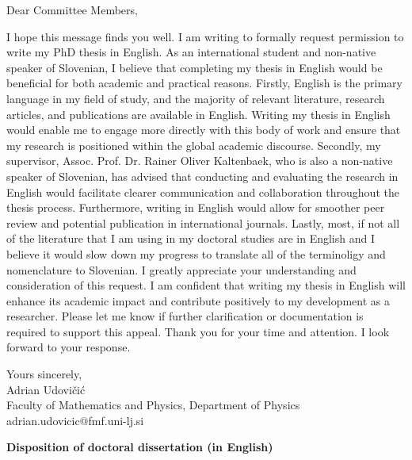 \documentclass{article}
\theoremstyle{mytheoremstyle}
\theoremstyle{mytheoremstyle}
\theoremstyle{myproblemstyle}
\begin{document}
\vspace{1cm} %
Dear Committee Members,
\vspace{1cm}

I hope this message finds you well. I am writing to formally request permission to write my PhD thesis in English.
As an international student and non-native speaker of Slovenian, I believe that completing my thesis in English would be beneficial for both academic and practical reasons.
Firstly, English is the primary language in my field of study, and the majority of relevant literature, research articles, and publications are available in English.
Writing my thesis in English would enable me to engage more directly with this body of work and ensure that my research is positioned within the global academic discourse.
Secondly, my supervisor, Assoc. Prof. Dr. Rainer Oliver Kaltenbaek, who is also a non-native speaker of Slovenian, has advised that conducting and evaluating the research in
English would facilitate clearer communication and collaboration throughout the thesis process. Furthermore, writing in English would allow for smoother peer review
and potential publication in international journals.
Lastly, most, if not all of the literature that I am using in my doctoral studies are in English and I believe it would slow down my progress to translate
all of the terminoligy and nomenclature to Slovenian.
I greatly appreciate your understanding and consideration of this request. I am confident that writing my thesis in English will enhance its academic
impact and contribute positively to my development as a researcher. Please let me know if further clarification or documentation is required to support this appeal.
Thank you for your time and attention. I look forward to your response.

\vspace{1cm}
Yours sincerely,\\
Adrian Udovičić\\
Faculty of Mathematics and Physics, Department of Physics\\
adrian.udovicic@fmf.uni-lj.si


\clearpage
\pagestyle{plain}

\begin{center}
	\textbf{\Large Disposition of doctoral dissertation (in English)}
\end{center}
\end{document}
